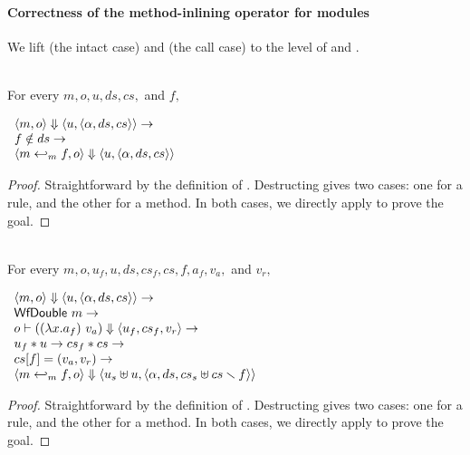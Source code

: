 \paragraph{Correctness of the method-inlining operator for modules}

We lift  (the intact case) and
 (the call case) to the level of
\Substep{} and \Substeps{}.

\begin{lemma}
  \label{lem-inlinedmm-substep-intact}
  \mbox{}\\
  For every $m, o, u, ds, cs,$ and $f,$
  \begin{center}
    \begin{math}
      \begin{array}{l}
        \langle m, o \rangle \Downarrow \langle u, \langle \alpha, ds, cs \rangle \rangle \to \\
        f \notin ds \to \\
        \langle m \hookleftarrow_{m}{} f, o \rangle \Downarrow \langle u, \langle \alpha, ds, cs \rangle \rangle
      \end{array}
    \end{math}
  \end{center}
\end{lemma}
\begin{proof}
  Straightforward by the definition of \Substep{}. Destructing
  \Substep{} gives two cases: one for a rule, and the other for a
  method. In both cases, we directly apply
   to prove the goal.
\end{proof}

\begin{lemma}
  \label{lem-inlinedmm-substep-call}
  \mbox{}\\
  For every $m, o, u_f, u, ds, cs_f, cs, f, a_f, v_a,$ and $v_r,$
  \begin{center}
    \begin{math}
      \begin{array}{l}
        \langle m, o \rangle \Downarrow \langle u, \langle \alpha, ds, cs \rangle \rangle \to \\
        \textsf{WfDouble}\ m \to \\
        o |- ((\lambda x.a_f)\ v_a) \Downarrow \langle u_f, cs_f, v_r \rangle \to \\
        u_f \ast u \to cs_f \ast cs \to \\
        cs[f] = (v_a, v_r) \to \\
        \langle m \hookleftarrow_{m}{} f, o \rangle \Downarrow \langle u_s \uplus u, \langle \alpha, ds, cs_s \uplus cs \smallsetminus{} f \rangle \rangle
      \end{array}
    \end{math}
  \end{center}
\end{lemma}
\begin{proof}
  Straightforward by the definition of \Substep{}. Destructing
  \Substep{} gives two cases: one for a rule, and the other for a
  method. In both cases, we directly apply
   to prove the goal.
\end{proof}

